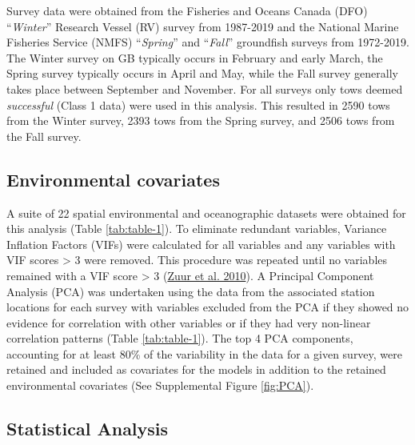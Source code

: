 \documentclass[
]{article}
\begin{document}
Survey data were obtained from the Fisheries and Oceans Canada (DFO) ``\emph{Winter}'' Research Vessel (RV) survey from 1987-2019 and the National Marine Fisheries Service (NMFS) ``\emph{Spring}'' and ``\emph{Fall}'' groundfish surveys from 1972-2019. The Winter survey on GB typically occurs in February and early March, the Spring survey typically occurs in April and May, while the Fall survey generally takes place between September and November. For all surveys only tows deemed \emph{successful} (Class 1 data) were used in this analysis. This resulted in 2590 tows from the Winter survey, 2393 tows from the Spring survey, and 2506 tows from the Fall survey.

\hypertarget{environmental-covariates}{%
\subsection{Environmental covariates}\label{environmental-covariates}}

A suite of 22 spatial environmental and oceanographic datasets were obtained for this analysis (Table \ref{tab:table-1}). To eliminate redundant variables, Variance Inflation Factors (VIFs) were calculated for all variables and any variables with VIF scores \textgreater{} 3 were removed. This procedure was repeated until no variables remained with a VIF score \textgreater{} 3 (\protect\hyperlink{ref-zuurProtocolDataExploration2010}{Zuur et al. 2010}). A Principal Component Analysis (PCA) was undertaken using the data from the associated station locations for each survey with variables excluded from the PCA if they showed no evidence for correlation with other variables or if they had very non-linear correlation patterns (Table \ref{tab:table-1}). The top 4 PCA components, accounting for at least 80\% of the variability in the data for a given survey, were retained and included as covariates for the models in addition to the retained environmental covariates (See Supplemental Figure \ref{fig:PCA}).

\hypertarget{statistical-analysis}{%
\subsection{Statistical Analysis}\label{statistical-analysis}}
\end{document}
